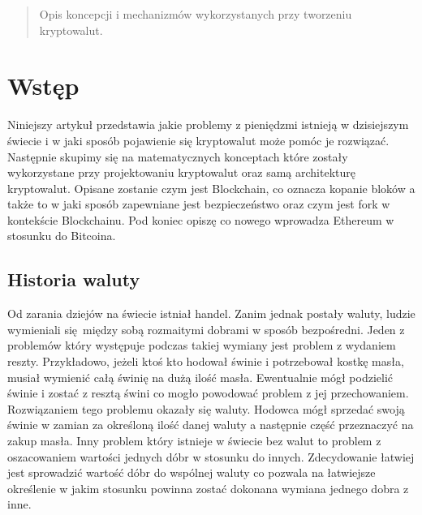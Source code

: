 \documentclass[conference]{IEEEtran}
\begin{document}
\begin{abstract}
Opis koncepcji i mechanizmów wykorzystanych przy tworzeniu kryptowalut.
\end{abstract}





%
\IEEEpeerreviewmaketitle

\section{Wstęp}

Niniejszy artykuł przedstawia jakie problemy z pieniędzmi istnieją w dzisiejszym świecie i w jaki sposób pojawienie się
kryptowalut może pomóc je rozwiązać. Następnie skupimy się na matematycznych konceptach które zostały wykorzystane przy
projektowaniu kryptowalut oraz samą architekturę kryptowalut. Opisane zostanie czym jest Blockchain, co oznacza kopanie
bloków a także to w jaki sposób zapewniane jest bezpieczeństwo oraz czym jest fork w kontekście Blockchainu. Pod koniec
opiszę co nowego wprowadza Ethereum w stosunku do Bitcoina.

\subsection{Historia waluty}

Od zarania dziejów na świecie istniał handel. Zanim jednak postały waluty, ludzie wymieniali się między sobą rozmaitymi
dobrami w sposób bezpośredni. Jeden z problemów który występuje podczas takiej wymiany jest problem z wydaniem reszty.
Przykładowo, jeżeli ktoś kto hodował świnie i potrzebował kostkę masła, musiał wymienić całą świnię na dużą ilość masła.
Ewentualnie mógł podzielić świnie i zostać z resztą świni co mogło powodować problem z jej przechowaniem. Rozwiązaniem
tego problemu okazały się waluty. Hodowca mógł sprzedać swoją świnie w zamian za określoną ilość danej waluty a
następnie część przeznaczyć na zakup masła. Inny problem który istnieje w świecie bez walut to problem z oszacowaniem
wartości jednych dóbr w stosunku do innych. Zdecydowanie łatwiej jest sprowadzić wartość dóbr do wspólnej waluty co
pozwala na łatwiejsze określenie w jakim stosunku powinna zostać dokonana wymiana jednego dobra z inne.
\end{document}
